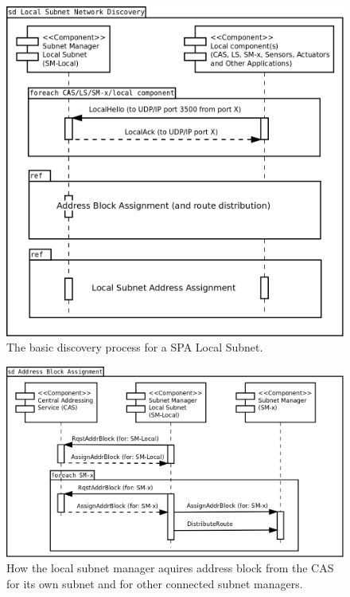 \begin{figure}[h]
    \centering
    \includegraphics[width=\textwidth]{figures/vn_local_subnet_network_discovery}
    \caption{The basic discovery process for a SPA Local Subnet.}
    \label{fig:appendix_vn_local_subnet_network_discovery}
\end{figure}

\begin{figure}[h]
    \centering
    \includegraphics[width=\textwidth]{figures/vn_address_block_assignment}
    \caption{How the local subnet manager aquires address block from the CAS
    for its own subnet and for other connected subnet managers.}
    \label{fig:appendix_vn_address_block_assignment}
\end{figure}

